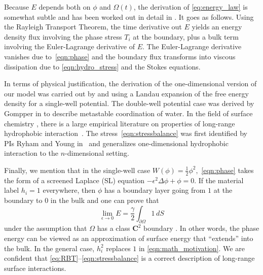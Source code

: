 Because $E$ depends both on $\phi$ and $\Omega(t)$,
the derivation of \eqref{eq:energy_law}
is somewhat subtle and has been worked out in detail in \cite{Fu2018_SIAM}.
It goes as follows.
Using the Rayleigh Transport Theorem, 
the time derivative out $E$ yields an energy
density flux involving the phase stress $T_i$
at the boundary, plus a bulk term involving 
the Euler-Lagrange derivative of $E.$
The Euler-Lagrange derivative vanishes due to~\eqref{eqn:phase}
and the boundary flux transforms into viscous dissipation due to 
\eqref{eqn:hydro_stress} and the Stokes equations. 


In terms of physical justification, the
derivation of the one-dimensional version of our model
was carried out by \cite{MaRa76} and \cite{ErLjCl89}
using a Landau expansion of the
free energy density for a single-well potential.
The double-well potential case was derived by
Gompper in \cite{GoHaKo94} to describe metastable coordination of water.
In the field of surface chemistry \cite{Israelachvili1954},
there is a large empirical literature on properties of
long-range hydrophobic interaction~\cite{LeRaPa77,KoNa15,
Nagle17,Lum1999, Lin2005, Meyer2006, Ducker2016,Jackson2016,Gletal88,Aketal17,Ch05}.
The stress~\eqref{eqn:stressbalance} was first
identified by PIs Ryham and Young in~\cite{Fu2018_SIAM}
and generalizes one-dimensional hydrophobic interaction to
the $n$-dimensional setting. 

Finally, we mention that in the single-well case
$W(\phi) = \tfrac{1}{2}\phi^2,$ \eqref{eqn:phase} takes the form
of a screened Laplace (SL) equation $-\epsilon^2 \Delta \phi + \phi =0$.
If the material label $h_i = 1$ everywhere, then $\phi$
has a boundary layer going from $1$ at the boundary to $0$ in the bulk
and one can prove that 
\begin{equation}
\label{eqn:math_motivation}
\lim_{\epsilon \to 0} E = \frac{\gamma}{2} \int_{\partial \Omega} 1 \,dS
\end{equation}
under the assumption that $\Omega$ has a class $\mathbf{C}^2$ boundary \cite{}.
In other words, the phase energy can be viewed as an
approximation of surface energy that ``extends'' into the bulk.
In the general case, $h_i^2$ replaces $1$ in \eqref{eqn:math_motivation}.
We are confident that \eqref{eq:RBT}--\eqref{eqn:stressbalance}
is a correct description of long-range surface interactions.

